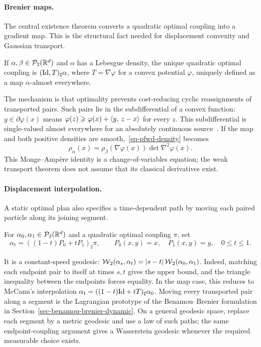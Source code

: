 \paragraph{Brenier maps.}
The central existence theorem converts a quadratic optimal coupling into a gradient map. This is the structural fact needed for displacement convexity and Gaussian transport.
\begin{thm}[Brenier]\label{thm-brenier}
If $\alpha,\beta\in\mathcal{P}_2(\mathbb{R}^d)$ and $\alpha$ has a Lebesgue density, the unique quadratic optimal coupling is $(\mathrm{Id},T)_\sharp\alpha$, where $T=\nabla\varphi$ for a convex potential $\varphi$, uniquely defined as a map $\alpha$-almost everywhere.
\end{thm}
The mechanism is that optimality prevents cost-reducing cyclic reassignments of transported pairs. Such pairs lie in the subdifferential of a convex function: $y\in\partial\varphi(x)$ means $\varphi(z)\geqslant\varphi(x)+\langle y,\,z-x\rangle$ for every $z$. This subdifferential is single-valued almost everywhere for an absolutely continuous source~\citep{Brenier91,Villani09}. If the map and both positive densities are smooth,~\eqref{eq-pfwd-density} becomes
\begin{equation}\label{eq-monge-ampere}
  \rho_\alpha(x)=\rho_\beta(\nabla\varphi(x))\det\nabla^2\varphi(x).
\end{equation}
This Monge--Amp\`ere identity is a change-of-variables equation; the weak transport theorem does not assume that its classical derivatives exist.

\paragraph{Displacement interpolation.}\label{sec-kantorovich-plan-interpolation}
A static optimal plan also specifies a time-dependent path by moving each paired particle along its joining segment.
\begin{defn}\label{def-w2-geodesic-induced-by-plan}
For $\alpha_0,\alpha_1\in\mathcal{P}_2(\mathbb{R}^d)$ and a quadratic optimal coupling $\pi$, set
\begin{equation}\label{eq-plan-interpolation}
  \alpha_t=((1-t)P_0+tP_1)_\sharp\pi,
  \qquad P_0(x,y)=x,\quad P_1(x,y)=y,\quad 0\leq t\leq1.
\end{equation}
\end{defn}
It is a constant-speed geodesic: $\operatorname{\mathcal{W}}_2(\alpha_s,\alpha_t)=|s-t|\operatorname{\mathcal{W}}_2(\alpha_0,\alpha_1)$. Indeed, matching each endpoint pair to itself at times $s,t$ gives the upper bound, and the triangle inequality between the endpoints forces equality. In the map case, this reduces to McCann's interpolation $\alpha_t=((1-t)\mathrm{Id}+tT)_\sharp\alpha_0$. Moving every transported pair along a segment is the Lagrangian prototype of the Benamou--Brenier formulation in Section~\ref{sec-benamou-brenier-dynamic}.
On a general geodesic space, replace each segment by a metric geodesic and use a law of such paths; the same endpoint-coupling argument gives a Wasserstein geodesic whenever the required measurable choice exists.

